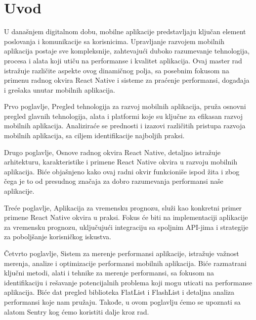 \documentclass[12pt,oneside]{memoir}
\begin{document}
\frontmatter
\naslovna
\komisija
\apstrakt
\tableofcontents*

\mainmatter

\chapter{Uvod}

U današnjem digitalnom dobu, mobilne aplikacije predstavljaju ključan element poslovanja i komunikacije sa korisnicima. Upravljanje razvojem mobilnih aplikacija postaje sve kompleksnije, zahtevajući duboko razumevanje tehnologija, procesa i alata koji utiču na performanse i kvalitet aplikacija. Ovaj master rad istražuje različite aspekte ovog dinamičnog polja, sa posebnim fokusom na primenu radnog okvira React Native i sisteme za praćenje performansi, događaja i grešaka unutar mobilnih aplikacija.

Prvo poglavlje, Pregled tehnologija za razvoj mobilnih aplikacija, pruža osnovni pregled glavnih tehnologija, alata i platformi koje su ključne za efikasan razvoj mobilnih aplikacija. Analiziraće se prednosti i izazovi različitih pristupa razvoja mobilnih aplikacija, sa ciljem identifikacije najboljih praksi.

Drugo poglavlje, Osnove radnog okvira React Native, detaljno istražuje arhitekturu, karakteristike i primene React Native okvira u razvoju mobilnih aplikacija. Biće objašnjeno kako ovaj radni okvir funkcioniše ispod žita i zbog čega je to od presudnog značaja za dobro razumevanja performansi naše aplikacije.

Treće poglavlje, Aplikacija za vremensku prognozu, služi kao konkretni primer primene React Native okvira u praksi. Fokus će biti na implementaciji aplikacije za vremensku prognozu, uključujući integraciju sa spoljnim API-jima i strategije za poboljšanje korisničkog iskustva.

Četvrto poglavlje, Sistem za merenje performansi aplikacije, istražuje važnost merenja, analize i optimizacije performansi mobilnih aplikacija. Biće razmatrani ključni metodi, alati i tehnike za merenje performansi, sa fokusom na identifikaciju i rešavanje potencijalnih problema koji mogu uticati na performanse aplikacija. Biće dat pregled biblioteka FlatList i FlashList i detaljna analiza performansi koje nam pružaju. Takođe, u ovom poglavlju ćemo se upoznati sa alatom Sentry kog ćemo koristiti dalje kroz rad. 
\end{document}
